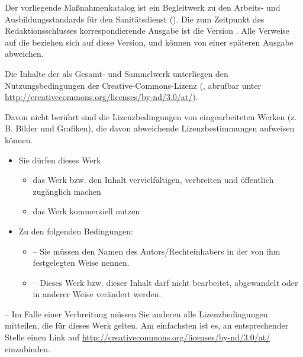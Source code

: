 \documentclass[
ngerman,
paper=a4,
asymmetric,
fontsize=8pt,
draft=false,
numbers=noenddot,
bibtotocnumbered,
footnotes=multiple,
toc=flat,
]{scrbook}
\begin{document}

Der vorliegende Maßnahmenkatalog ist ein Begleitwerk zu den
Arbeits- und Ausbildungsstandards für den Sanitätsdienst
(\AASS). Die zum Zeitpunkt des Redaktionsschlusses
korrespondierende Ausgabe ist die Version \VarAassVersion.
Alle Verweise auf die {\AASS} 
beziehen sich auf diese Version, und können von einer
späteren Ausgabe abweichen.


Die Inhalte der {\AASS} als Gesamt- und Sammelwerk unterliegen 
den Nutzungsbedingungen der Creative-Commons-Lizenz  (, 
abrufbar
unter
\url{http://creativecommons.org/licenses/by-nd/3.0/at/}).

Davon nicht berührt sind die Lizenzbedingungen von eingearbeiteten Werken
(z.\,B. Bilder und Grafiken), die davon abweichende
Lizenzbestimmungen aufweisen können.

{

\begin{itemize}
  \item Sie dürfen dieses Werk
  \begin{itemize}
    \item das Werk bzw. den Inhalt vervielfältigen, verbreiten und öffentlich zugänglich machen
    \item das Werk kommerziell nutzen
  \end{itemize}
  \item Zu den folgenden Bedingungen: 
\begin{itemize}
  \item {} -- Sie müssen den Namen des
  Autors/Rechteinhabers in der von ihm festgelegten Weise
  nennen.
    \item {} -- Dieses Werk bzw. dieser
    Inhalt darf nicht bearbeitet, abgewandelt oder in
    anderer Weise verändert werden.
  \end{itemize}
\end{itemize}
 -- Im Falle einer Verbreitung müssen Sie
anderen alle Lizenzbedingungen mitteilen, die für dieses
Werk gelten. Am einfachsten ist es, an entsprechender Stelle
einen Link auf \url{http://creativecommons.org/licenses/by-nd/3.0/at/} einzubinden.
}


\dominitoc[n]
\end{document}
